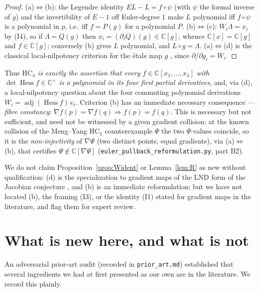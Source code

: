 \documentclass[11pt]{article}
\theoremstyle{plain}
\theoremstyle{definition}
\newcommand{\C}{\mathbb{C}}
\newcommand{\Hess}{\operatorname{Hess}}
\newcommand{\adj}{\operatorname{adj}}
\newcommand{\HC}{\mathrm{HC}}
\begin{document}
\begin{proof}
(a)$\Leftrightarrow$(b): the Legendre identity $EL-L=f\circ\psi$ (with
$\psi$ the formal inverse of $g$) and the invertibility of $E-1$ off
Euler-degree $1$ make $L$ polynomial iff $f\circ\psi$ is a polynomial in
$p$, i.e.\ iff $f=P(g)$ for a polynomial $P$. (b)$\Leftrightarrow$(c):
$W_i\Lambda=x_i$ by (I4), so if $\Lambda=Q(g)$ then $x_i=(\partial_iQ)(g)\in\C[g]$,
whence $\C[x]=\C[g]$ and $f\in\C[g]$; conversely (b) gives $L$ polynomial,
and $L\circ g=\Lambda$. (a)$\Leftrightarrow$(d) is the classical
local-nilpotency criterion for the étale map $g$
\cite[Ch.~1]{vandenEssenBook}, since $\partial/\partial g_i=W_i$.
\end{proof}

Thus \emph{$\HC_4$ is exactly the assertion that every $f\in\C[x_1,\dots,x_4]$
with $\det\Hess f\in\C^\times$ is a polynomial in its four first partial
derivatives}, and, via (d), a local-nilpotency question about the four
commuting polynomial derivations $W_i=\adj(\Hess f)\,e_i$. Criterion (b)
has an immediate necessary consequence --- \emph{fibre constancy}:
$\nabla f(p)=\nabla f(q)\Rightarrow f(p)=f(q)$. This is necessary but not
sufficient, and need not be witnessed by a given gradient collision: at the
known collision of the Meng--Yang $\HC_5$ counterexample $\Psi$ the two
$\Psi$-values coincide, so it is the \emph{non-injectivity} of $\nabla\Psi$
(two distinct points, equal gradients), via (a)$\Leftrightarrow$(b), that
certifies $\Psi\notin\C[\nabla\Psi]$
(\texttt{euler\_pullback\_reformulation.py}, part B2).

We do not claim Proposition~\ref{prop:Wident} or Lemma~\ref{lem:R} as new
without qualification: (d) is the specialization to gradient maps of the
LND form of the Jacobian conjecture \cite{vandenEssenBook}, and (b) is an
immediate reformulation; but we have not located (b), the framing (I3), or
the identity (I1) stated for gradient maps in the literature, and flag them
for expert review.

\section{What is new here, and what is not}

An adversarial prior-art audit (recorded in \texttt{prior\_art.md})
established that several ingredients we had at first presented as our own
are in the literature. We record this plainly.
\end{document}
